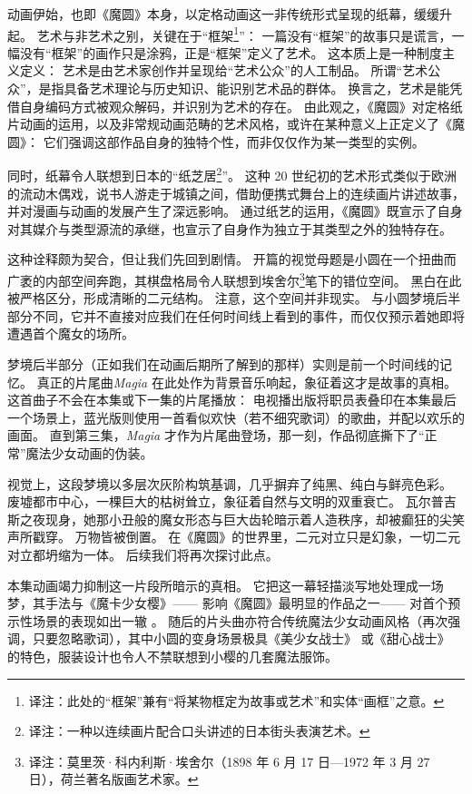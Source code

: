 动画伊始，也即《魔圆》本身，以定格动画这一非传统形式呈现的纸幕，缓缓升起。
艺术与非艺术之别，关键在于“框架\footnote{%
    译注：此处的“框架”兼有“将某物框定为故事或艺术”和实体“画框”之意。
}”：
一篇没有“框架”的故事只是谎言，一幅没有“框架”的画作只是涂鸦，正是“框架”定义了艺术。
这本质上是一种制度主义定义：
艺术是由艺术家创作并呈现给“艺术公众”的人工制品。
所谓“艺术公众”，是指具备艺术理论与历史知识、能识别艺术品的群体\cite{adajian-nodate-definition-art}。
换言之，艺术是能凭借自身编码方式被观众解码，并识别为艺术的存在。
由此观之，《魔圆》对定格纸片动画的运用，以及非常规动画范畴的艺术风格，或许在某种意义上正定义了《魔圆》：
它们强调这部作品自身的独特个性，而非仅仅作为某一类型的实例。

同时，纸幕令人联想到日本的“纸芝居\footnote{%
    译注：一种以连续画片配合口头讲述的日本街头表演艺术。
}”。
这种 20 世纪初的艺术形式类似于欧洲的流动木偶戏，说书人游走于城镇之间，借助便携式舞台上的连续画片讲述故事，并对漫画与动画的发展产生了深远影响\cite{nash2009raising-curtain}。
通过纸艺的运用，《魔圆》既宣示了自身对其媒介与类型源流的承继，也宣示了自身作为独立于其类型之外的独特存在。

这种诠释颇为契合，但让我们先回到剧情。
开篇的视觉母题是小圆在一个扭曲而广袤的内部空间奔跑，其棋盘格局令人联想到埃舍尔\footnote{%
    译注：莫里茨·科内利斯·埃舍尔（1898 年 6 月 17 日—1972 年 3 月 27 日），荷兰著名版画艺术家。
}笔下的错位空间。
黑白在此被严格区分，形成清晰的二元结构。
注意，这个空间并非现实。
与小圆梦境后半部分不同，它并不直接对应我们在任何时间线上看到的事件，而仅仅预示着她即将遭遇首个魔女的场所。

梦境后半部分（正如我们在动画后期所了解到的那样）实则是前一个时间线的记忆。
真正的片尾曲\emph{Magia} 在此处作为背景音乐响起，象征着这才是故事的真相。
这首曲子不会在本集或下一集的片尾播放：
电视播出版将职员表叠印在本集最后一个场景上，蓝光版则使用一首看似欢快（若不细究歌词）的歌曲，并配以欢乐的画面。
直到第三集，\emph{Magia} 才作为片尾曲登场，那一刻，作品彻底撕下了“正常”魔法少女动画的伪装。

视觉上，这段梦境以多层次灰阶构筑基调，几乎摒弃了纯黑、纯白与鲜亮色彩。
废墟都市中心，一棵巨大的枯树耸立，象征着自然与文明的双重衰亡。
瓦尔普吉斯之夜现身，她那小丑般的魔女形态与巨大齿轮暗示着人造秩序，却被癫狂的尖笑声所戳穿。
万物皆被倒置。
在《魔圆》的世界里，二元对立只是幻象，一切二元对立都坍缩为一体。
后续我们将再次探讨此点。

本集动画竭力抑制这一片段所暗示的真相。
它把这一幕轻描淡写地处理成一场梦，其手法与《魔卡少女樱》——
影响《魔圆》最明显的作品之一——
对首个预示性场景的表现如出一辙
\cite{cardcaptor-sakura-episode1-2014}。
随后的片头曲亦符合传统魔法少女动画风格（再次强调，只要忽略歌词），其中小圆的变身场景极具《美少女战士》
\cite{sailor-moon-episode1-2014}或《甜心战士》
\cite{cutie-honey-episode1-2013}的特色，服装设计也令人不禁联想到小樱的几套魔法服饰。

